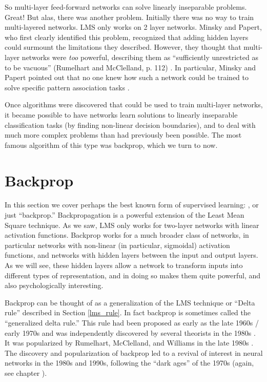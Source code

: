 So multi-layer feed-forward networks can solve linearly inseparable problems. Great!  But alas, there was another  problem. Initially there was no way to train multi-layered networks. LMS only works on 2 layer networks. Minsky and Papert, who first clearly identified this problem, recognized that adding hidden layers could surmount the limitations they described. However, they thought that multi-layer networks were {\em too} powerful, describing them as ``sufficiently unrestricted as to be vacuous'' (Rumelhart and McClelland, p. 112) \cite{rumelhart1986parallel}. In particular, Minsky and Papert pointed out that no one knew how such a network could be trained to solve specific pattern association tasks \cite{minsky1969perceptrons}.

Once algorithms were discovered that could be used to train multi-layer networks, it became possible to have networks learn solutions to linearly inseparable classification tasks (by finding non-linear decision boundaries), and to deal with much more complex problems than had previously been possible. The most famous algorithm of this type was backprop, which we turn to now.

\section{Backprop}

In this section we cover perhaps the best known form of supervised learning: , or just ``backprop.'' Backpropagation is a powerful extension of the Least Mean Square  technique. As we saw, LMS only works for two-layer networks with linear activation functions. Backprop works for a much broader class of networks, in particular networks with non-linear (in particular, sigmoidal) activation functions, and networks with hidden layers between the input and output layers. As we will see, these hidden layers allow a network to transform inputs into different types of representation, and in doing so makes them quite powerful, and also psychologically interesting. 

Backprop can be thought of as a generalization of the LMS technique or ``Delta rule'' described in Section \ref{lms_rule}. In fact backprop is sometimes called the ``generalized delta rule.'' This rule had been proposed as early as the late 1960s / early 1970s \cite{bryson1969applied, werbos1974beyond} and was independently discovered by several theorists in the 1980s \cite{le1986learning, parker1985learning}. It was popularized by Rumelhart, McClelland, and Williams in the late 1980s \cite{rumelhart1986parallel}. The discovery and popularization of backprop led to a revival of interest in neural networks in the 1980s and 1990s, following the ``dark ages'' of the 1970s (again, see chapter ).

